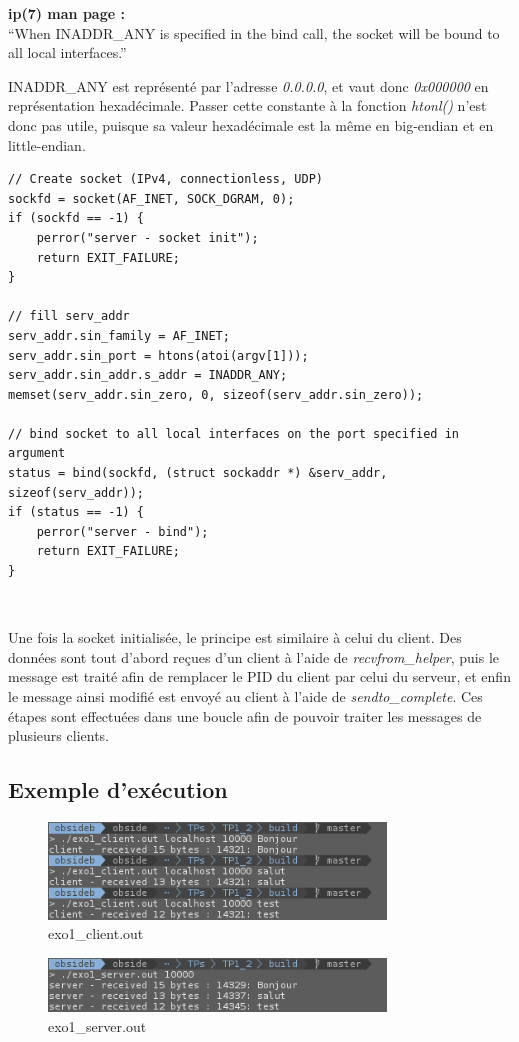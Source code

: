 \begin{mdframed}[backgroundcolor=lightblue, linecolor=darkblue]
\textbf{ip(7) man page :}\\
``When INADDR\_ANY is specified in the bind call, the  socket will be bound to all local interfaces.''
\end{mdframed}

\begin{mdframed}[backgroundcolor=hintbg, linecolor=hintborder]
INADDR\_ANY est représenté par l'adresse \emph{0.0.0.0}, et vaut donc \emph{0x000000} en représentation hexadécimale. Passer cette constante à la fonction \emph{htonl()} n'est donc pas utile, puisque sa valeur hexadécimale est la même en big-endian et en little-endian.
\end{mdframed}
\newpage

\begin{lstlisting}
// Create socket (IPv4, connectionless, UDP)
sockfd = socket(AF_INET, SOCK_DGRAM, 0);
if (sockfd == -1) {
    perror("server - socket init");
    return EXIT_FAILURE;
}

// fill serv_addr
serv_addr.sin_family = AF_INET;
serv_addr.sin_port = htons(atoi(argv[1]));
serv_addr.sin_addr.s_addr = INADDR_ANY;
memset(serv_addr.sin_zero, 0, sizeof(serv_addr.sin_zero));

// bind socket to all local interfaces on the port specified in argument
status = bind(sockfd, (struct sockaddr *) &serv_addr, sizeof(serv_addr));
if (status == -1) {
    perror("server - bind");
    return EXIT_FAILURE;
}
\end{lstlisting}
\

Une fois la socket initialisée, le principe est similaire à celui du client. Des données sont tout d'abord reçues d'un client à l'aide de \emph{recvfrom\_helper}, puis le message est traité afin de remplacer le PID du client par celui du serveur, et enfin le message ainsi modifié est envoyé au client à l'aide de \emph{sendto\_complete}. Ces étapes sont effectuées dans une boucle afin de pouvoir traiter les messages de plusieurs clients.

\subsection{Exemple d'exécution}
\begin{figure}[h!]
	\centering
	\includegraphics[width=0.8\textwidth]{screenshots/ex1_client.png}
	\caption{exo1\_client.out}
\end{figure}

\begin{figure}[h!]
	\centering
	\includegraphics[width=0.8\textwidth]{screenshots/ex1_server.png}
	\caption{exo1\_server.out}
\end{figure}
